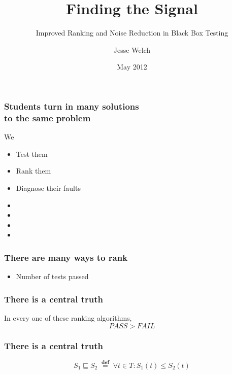 \documentclass[svgnames,14pt]{beamer}
\title{Finding the Signal}
\subtitle{Improved Ranking and Noise Reduction in Black Box Testing}
\author{Jesse Welch}
\date{May 2012}
\newcommand\fail{\mathit{FAIL}}
\newcommand\pass{\mathit{PASS}}
\newcommand\defined{\mathrel{\;\stackrel{\scriptscriptstyle\mathbf{def}}{=}\;}}
\theoremstyle{definition}
\begin{document}
\begin{frame}
\maketitle
\end{frame}


\begin{frame}
\frametitle{Students turn in many solutions \\ to the same problem}
We 
\begin{itemize}
\item Test them \uncover<2->{\textbf{cheaply}}
\item Rank them 
\item Diagnose their faults 
\end{itemize}
\end{frame}

\begin{frame}
\begin{itemize}
\frametitle{Overview}
\item {}
\item {}
\item {}
\item {}
\end{itemize}
\end{frame}

\begin{frame}
\frametitle{There are many ways to rank}
\begin{itemize}
\item Number of tests passed
\end{itemize}
\end{frame}

\begin{frame}
\frametitle{There is a central truth}
In every one of these ranking algorithms,
$$\pass>\fail$$
\end{frame}

\begin{frame}
\frametitle{There is a central truth}
\begin{block}{}
$$S_1 \sqsubseteq S_2 \defined \forall t \in T : S_1(t) \leq S_2(t)$$
\end{block}
\end{frame}
\end{document}
